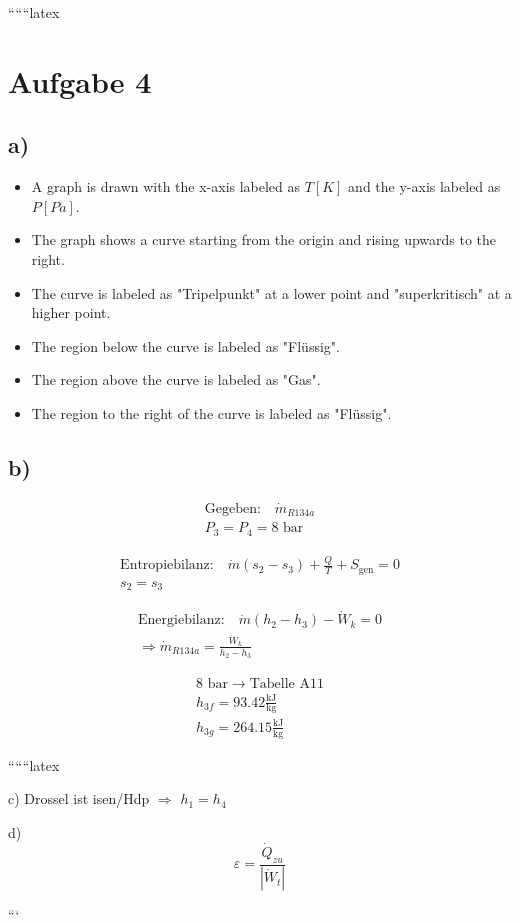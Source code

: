 
``````latex


\section*{Aufgabe 4}

\subsection*{a)}

\begin{itemize}
    \item A graph is drawn with the x-axis labeled as $T [K]$ and the y-axis labeled as $P [Pa]$.
    \item The graph shows a curve starting from the origin and rising upwards to the right.
    \item The curve is labeled as "Tripelpunkt" at a lower point and "superkritisch" at a higher point.
    \item The region below the curve is labeled as "Flüssig".
    \item The region above the curve is labeled as "Gas".
    \item The region to the right of the curve is labeled as "Flüssig".
\end{itemize}

\subsection*{b)}

\begin{align*}
    \text{Gegeben:} \quad \dot{m}_{R134a} \\
    P_3 = P_4 = 8 \text{ bar}
\end{align*}


\begin{align*}
    \text{Entropiebilanz:} \quad \dot{m} (s_2 - s_3) + \frac{Q}{T} + S_{\text{gen}} = 0 \\
    s_2 = s_3
\end{align*}

\begin{align*}
    \text{Energiebilanz:} \quad \dot{m} (h_2 - h_3) - \dot{W}_k = 0 \\
    \Rightarrow \dot{m}_{R134a} = \frac{\dot{W}_k}{h_2 - h_3}
\end{align*}


\begin{align*}
    8 \text{ bar} \rightarrow \text{Tabelle A11} \\
    h_{3f} = 93.42 \frac{\text{kJ}}{\text{kg}} \\
    h_{3g} = 264.15 \frac{\text{kJ}}{\text{kg}}
\end{align*}

``````latex

c) Drossel ist isen/Hdp $\Rightarrow$ $h_1 = h_4$

d) \[
\varepsilon = \frac{\dot{Q}_{zu}}{\left| \dot{W}_{t} \right|}
\]

```